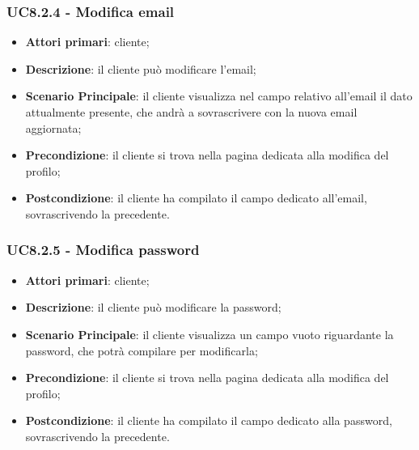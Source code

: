 \subsubsection{UC8.2.4 - Modifica email}
\begin{itemize}
\item \textbf{Attori primari}: cliente;
\item \textbf{Descrizione}: il cliente può modificare l'email;
\item \textbf{Scenario Principale}: il cliente visualizza nel campo relativo all'email il dato attualmente presente, che andrà a sovrascrivere con la nuova email aggiornata;
\item \textbf{Precondizione}: il cliente si trova nella pagina dedicata alla modifica del profilo;
\item \textbf{Postcondizione}: il cliente ha compilato il campo dedicato all'email, sovrascrivendo la precedente.
\end{itemize}

\subsubsection{UC8.2.5 - Modifica password}
\begin{itemize}
\item \textbf{Attori primari}: cliente;
\item \textbf{Descrizione}: il cliente può modificare la password;
\item \textbf{Scenario Principale}: il cliente visualizza un campo vuoto riguardante la password, che potrà compilare per modificarla;
\item \textbf{Precondizione}: il cliente si trova nella pagina dedicata alla modifica del profilo;
\item \textbf{Postcondizione}: il cliente ha compilato il campo dedicato alla password, sovrascrivendo la precedente.
\end{itemize}

